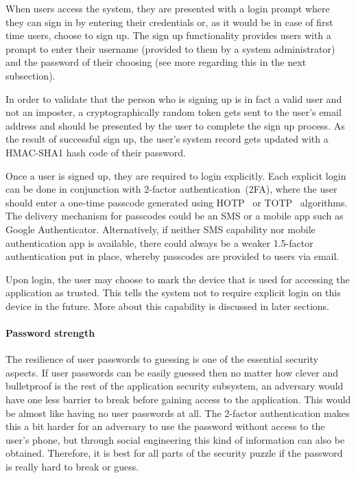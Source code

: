 \documentclass[a4paper,12pt,oneside,openright]{memoir}
\begin{document}
	When users access the system, they are presented with a login prompt where they can sign in by entering their credentials or, as it would be in case of first time users, choose to sign up.
	The sign up functionality provides users with a prompt to enter their username (provided to them by a system administrator) and the password of their choosing (see more regarding this in the next subsection).

	In order to validate that the person who is signing up is in fact a valid user and not an imposter, a cryptographically random token gets sent to the user's email address and should be presented by the user to complete the sign up process.
	As the result of successful sign up, the user's system record gets updated with a HMAC-SHA1 hash code of their password.

	Once a user is signed up, they are required to login explicitly.
	Each explicit login can be done in conjunction with 2-factor authentication~(2FA), where the user should enter a one-time passcode generated using HOTP~\cite{HOTP} or TOTP~\cite{TOTP} algorithms.
	The delivery mechanism for passcodes could be an SMS or a mobile app such as Google Authenticator.
	Alternatively, if neither SMS capability nor mobile authentication app is available, there could always be a weaker 1.5-factor authentication put in place, whereby passcodes are provided to users via email.

	Upon login, the user may choose to mark the device that is used for accessing the application as trusted.
	This tells the system not to require explicit login on this device in the future.
	More about this capability is discussed in later sections.

	\paragraph*{Password strength}
	The resilience of user passwords to guessing is one of the essential security aspects.
	If user passwords can be easily guessed then no matter how clever and bulletproof is the rest of the application security subsystem, an adversary would have one less barrier to break before gaining access to the application.
	This would be almost like having no user passwords at all.
	The 2-factor authentication makes this a bit harder for an adversary to use the password without access to the user's phone, but through social engineering this kind of information can also be obtained.
	Therefore, it is best for all parts of the security puzzle if the password is really hard to break or guess.
\end{document}
